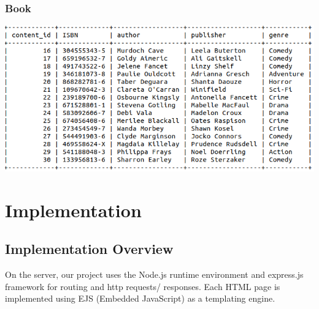 \documentclass[letter, 12pt, titlepage]{article}
\begin{document}
\subsubsection{Book}
\includegraphics[scale=.5]{book.png}

\section{Implementation}

\subsection{Implementation Overview}
	On the server, our project uses the Node.js runtime environment and express.js framework for routing and  http requests/ responses. Each HTML page is implemented using EJS (Embedded JavaScript) as a templating engine. 
\end{document}
